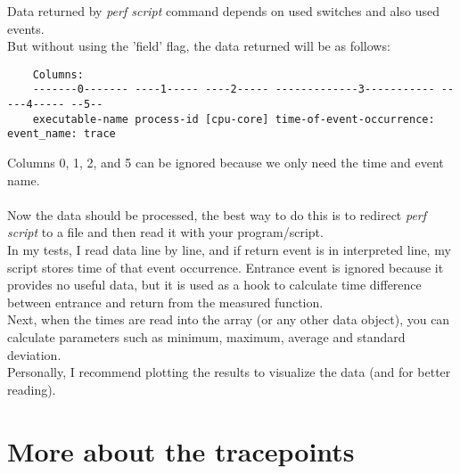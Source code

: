 \documentclass[11pt,onecolumn]{article}
\begin{document}
Data returned by \textit{perf script} command depends on used switches and also used events.\\
But without using the 'field' flag, the data returned will be as follows:
\begin{verbatim}
	Columns:
	-------0------- ----1----- ----2----- -------------3----------- -----4----- --5--
	executable-name process-id [cpu-core] time-of-event-occurrence: event_name: trace
\end{verbatim}
Columns 0, 1, 2, and 5 can be ignored because we only need the time and event name.\\\\
Now the data should be processed, the best way to do this is to redirect \textit{perf script} to a file and then read it with your program/script.\\
In my tests, I read data line by line, and if return event is in interpreted line, my script stores time of that event occurrence. Entrance event is ignored because it provides no useful data, but it is used as a hook to calculate time difference between entrance and return from the measured function.\\
Next, when the times are read into the array (or any other data object), you can calculate parameters such as minimum, maximum, average and standard deviation.\\
Personally, I recommend plotting the results to visualize the data (and for better reading).


\newpage

\section{More about the tracepoints}
\end{document}
